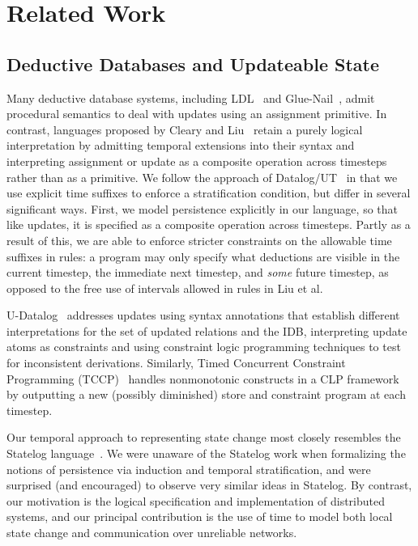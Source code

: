\section{Related Work}


\subsection{Deductive Databases and Updateable State}

Many deductive database systems, including LDL~\cite{ldl} and Glue-Nail~\cite{glue-nail}, admit procedural semantics to deal with updates using an
assignment primitive.  In contrast, languages proposed by Cleary and Liu~\cite{harmful,deductiveupdates,starlog} retain a purely logical 
interpretation by admitting temporal extensions into their syntax and interpreting assignment or update as a composite operation
across timesteps~\cite{deductiveupdates} rather than as a primitive.  We follow the approach of Datalog/UT~\cite{deductiveupdates} in that we use explicit time suffixes to enforce a stratification condition,
but differ in several significant ways.
First, we model persistence explicitly in our language, so that like updates, it is specified as a composite operation across timesteps.
Partly as a result of this, we are able to enforce stricter constraints on the allowable time suffixes in rules: a program may only specify what deductions are visible
in the current timestep, the immediate next timestep, and \emph{some} future timestep, as opposed to the free use of intervals allowed in rules in Liu et al.  


U-Datalog~\cite{udatalog-neg} addresses updates using syntax annotations that establish different interpretations for the set of updated 
relations and the IDB, interpreting update atoms as constraints and using constraint logic programming techniques to test for inconsistent
derivations.  Similarly, Timed Concurrent Constraint Programming (TCCP)~\cite{tdccp,tccp} handles nonmonotonic constructs in a CLP framework
by outputting a new (possibly diminished) store and constraint program at each timestep.  

Our temporal approach to representing state change most closely resembles the
Statelog language~\cite{statelog}.  We were unaware of the Statelog work when formalizing the 
notions of persistence via induction and temporal stratification, and were surprised
(and encouraged) to observe very similar ideas in Statelog.  By contrast, our motivation is
the logical specification and implementation of distributed systems, and our 
principal contribution is the use of time to model both local state change and communication
over unreliable networks.

